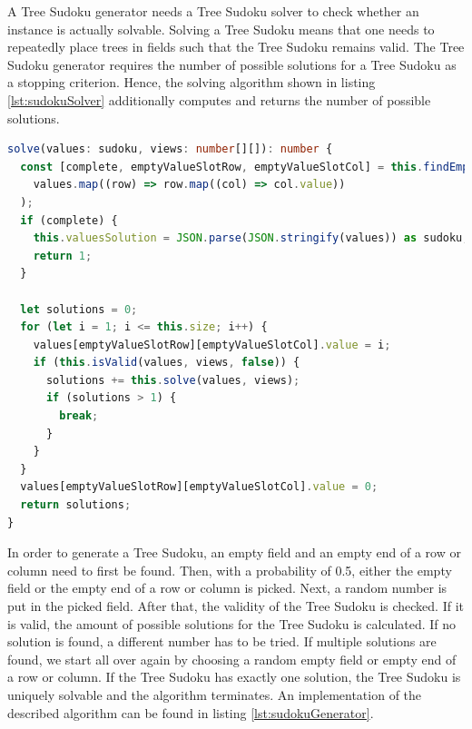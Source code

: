 A Tree Sudoku generator needs a Tree Sudoku solver to check whether an instance is actually solvable. Solving a Tree Sudoku means that one needs to repeatedly place trees in fields such that the Tree Sudoku remains valid. The Tree Sudoku generator requires the number of possible solutions for a Tree Sudoku as a stopping criterion. Hence, the solving algorithm shown in listing \ref{lst:sudokuSolver} additionally computes and returns the number of possible solutions.

\begin{lstlisting}[language=TypeScript,caption={Solving algorithm for a Tree Sudoku instance},label={lst:sudokuSolver}]
solve(values: sudoku, views: number[][]): number {
  const [complete, emptyValueSlotRow, emptyValueSlotCol] = this.findEmptySlot(
    values.map((row) => row.map((col) => col.value))
  );
  if (complete) {
    this.valuesSolution = JSON.parse(JSON.stringify(values)) as sudoku; // deep copy
    return 1;
  }

  let solutions = 0;
  for (let i = 1; i <= this.size; i++) {
    values[emptyValueSlotRow][emptyValueSlotCol].value = i;
    if (this.isValid(values, views, false)) {
      solutions += this.solve(values, views);
      if (solutions > 1) {
        break;
      }
    }
  }
  values[emptyValueSlotRow][emptyValueSlotCol].value = 0;
  return solutions;
}
\end{lstlisting}

In order to generate a Tree Sudoku, an empty field and an empty end of a row or column need to first be found. Then, with a probability of 0.5, either the empty field or the empty end of a row or column is picked. Next, a random number is put in the picked field. After that, the validity of the Tree Sudoku is checked. If it is valid, the amount of possible solutions for the Tree Sudoku is calculated. If no solution is found, a different number has to be tried. If multiple solutions are found, we start all over again by choosing a random empty field or empty end of a row or column. If the Tree Sudoku has exactly one solution, the Tree Sudoku is uniquely solvable and the algorithm terminates. An implementation of the described algorithm can be found in listing \ref{lst:sudokuGenerator}.

